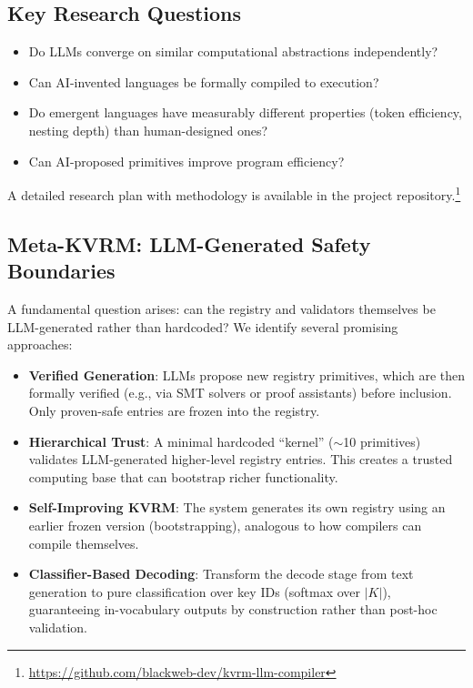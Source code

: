\documentclass[11pt,a4paper]{article}
\begin{document}
\subsection{Key Research Questions}

\begin{itemize}
    \item Do LLMs converge on similar computational abstractions independently?
    \item Can AI-invented languages be formally compiled to execution?
    \item Do emergent languages have measurably different properties (token efficiency, nesting depth) than human-designed ones?
    \item Can AI-proposed primitives improve program efficiency?
\end{itemize}

A detailed research plan with methodology is available in the project repository.\footnote{\url{https://github.com/blackweb-dev/kvrm-llm-compiler}}

\subsection{Meta-KVRM: LLM-Generated Safety Boundaries}

A fundamental question arises: can the registry and validators themselves be LLM-generated rather than hardcoded? We identify several promising approaches:

\begin{itemize}
    \item \textbf{Verified Generation}: LLMs propose new registry primitives, which are then formally verified (e.g., via SMT solvers or proof assistants) before inclusion. Only proven-safe entries are frozen into the registry.

    \item \textbf{Hierarchical Trust}: A minimal hardcoded ``kernel'' ($\sim$10 primitives) validates LLM-generated higher-level registry entries. This creates a trusted computing base that can bootstrap richer functionality.

    \item \textbf{Self-Improving KVRM}: The system generates its own registry using an earlier frozen version (bootstrapping), analogous to how compilers can compile themselves.

    \item \textbf{Classifier-Based Decoding}: Transform the decode stage from text generation to pure classification over key IDs (softmax over $|K|$), guaranteeing in-vocabulary outputs by construction rather than post-hoc validation.
\end{itemize}
\end{document}
